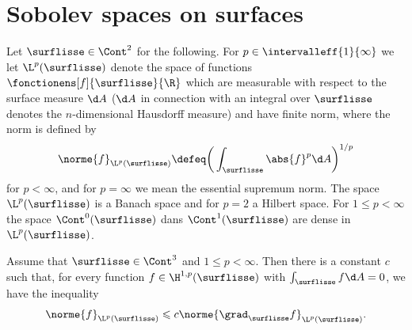 \chapter{Sobolev spaces on surfaces}

\cite[p. 299]{dziuk_finite_2013} Let $\surflisse \in \Cont^2$ for the following. For $p \in \intervalleff{1}{\infty}$ we let $\L^p(\surflisse)$ denote the space of functions $\fonctionens[f]{\surflisse}{\R}$ which are measurable with respect to the surface measure $\d A$ ($\d A$ in connection with an integral over $\surflisse$ denotes the $n$-dimensional Hausdorff measure) and have finite norm, where the norm is defined by 
\[
\norme{f}_{\L^p(\surflisse)} \defeq \bigg( \int_{\surflisse} \abs{f}^p \d A \bigg)^{1/p}
\]
for $p < \infty$, and for $p = \infty$ we mean the essential supremum norm. The space $\L^p(\surflisse)$ is a Banach space and for $p = 2$ a Hilbert space. For $1 \leqslant p < \infty$ the space $\Cont^0(\surflisse)$ dans $\Cont^1(\surflisse)$ are dense in $\L^p(\surflisse)$. 

\begin{theo}
    Assume that $\surflisse \in \Cont^3$ and $1 \leqslant p < \infty$. Then there is a constant $c$ such that, for every function $f \in \H^{1,p}(\surflisse)$ with $\int_{\surflisse} f \d A = 0$, we have the inequality
    \[
    \norme{f}_{\L^p(\surflisse)} \leqslant c \norme{\grad_{\surflisse} f}_{\L^p(\surflisse)}.
    \]
\end{theo}